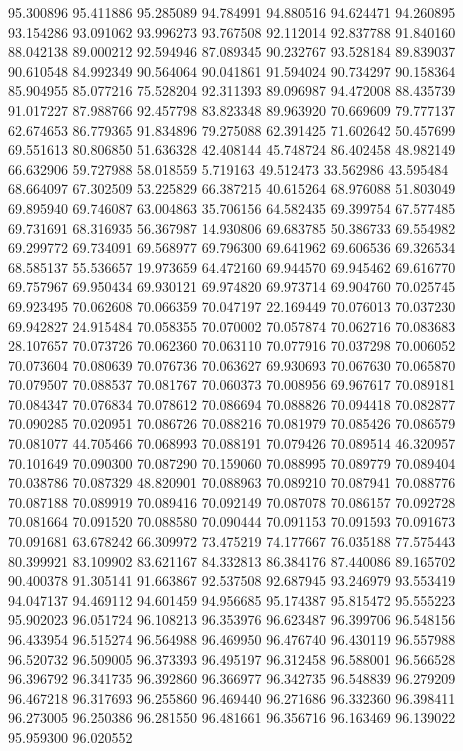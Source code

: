 95.300896
95.411886
95.285089
94.784991
94.880516
94.624471
94.260895
93.154286
93.091062
93.996273
93.767508
92.112014
92.837788
91.840160
88.042138
89.000212
92.594946
87.089345
90.232767
93.528184
89.839037
90.610548
84.992349
90.564064
90.041861
91.594024
90.734297
90.158364
85.904955
85.077216
75.528204
92.311393
89.096987
94.472008
88.435739
91.017227
87.988766
92.457798
83.823348
89.963920
70.669609
79.777137
62.674653
86.779365
91.834896
79.275088
62.391425
71.602642
50.457699
69.551613
80.806850
51.636328
42.408144
45.748724
86.402458
48.982149
66.632906
59.727988
58.018559
5.719163
49.512473
33.562986
43.595484
68.664097
67.302509
53.225829
66.387215
40.615264
68.976088
51.803049
69.895940
69.746087
63.004863
35.706156
64.582435
69.399754
67.577485
69.731691
68.316935
56.367987
14.930806
69.683785
50.386733
69.554982
69.299772
69.734091
69.568977
69.796300
69.641962
69.606536
69.326534
68.585137
55.536657
19.973659
64.472160
69.944570
69.945462
69.616770
69.757967
69.950434
69.930121
69.974820
69.973714
69.904760
70.025745
69.923495
70.062608
70.066359
70.047197
22.169449
70.076013
70.037230
69.942827
24.915484
70.058355
70.070002
70.057874
70.062716
70.083683
28.107657
70.073726
70.062360
70.063110
70.077916
70.037298
70.006052
70.073604
70.080639
70.076736
70.063627
69.930693
70.067630
70.065870
70.079507
70.088537
70.081767
70.060373
70.008956
69.967617
70.089181
70.084347
70.076834
70.078612
70.086694
70.088826
70.094418
70.082877
70.090285
70.020951
70.086726
70.088216
70.081979
70.085426
70.086579
70.081077
44.705466
70.068993
70.088191
70.079426
70.089514
46.320957
70.101649
70.090300
70.087290
70.159060
70.088995
70.089779
70.089404
70.038786
70.087329
48.820901
70.088963
70.089210
70.087941
70.088776
70.087188
70.089919
70.089416
70.092149
70.087078
70.086157
70.092728
70.081664
70.091520
70.088580
70.090444
70.091153
70.091593
70.091673
70.091681
63.678242
66.309972
73.475219
74.177667
76.035188
77.575443
80.399921
83.109902
83.621167
84.332813
86.384176
87.440086
89.165702
90.400378
91.305141
91.663867
92.537508
92.687945
93.246979
93.553419
94.047137
94.469112
94.601459
94.956685
95.174387
95.815472
95.555223
95.902023
96.051724
96.108213
96.353976
96.623487
96.399706
96.548156
96.433954
96.515274
96.564988
96.469950
96.476740
96.430119
96.557988
96.520732
96.509005
96.373393
96.495197
96.312458
96.588001
96.566528
96.396792
96.341735
96.392860
96.366977
96.342735
96.548839
96.279209
96.467218
96.317693
96.255860
96.469440
96.271686
96.332360
96.398411
96.273005
96.250386
96.281550
96.481661
96.356716
96.163469
96.139022
95.959300
96.020552
